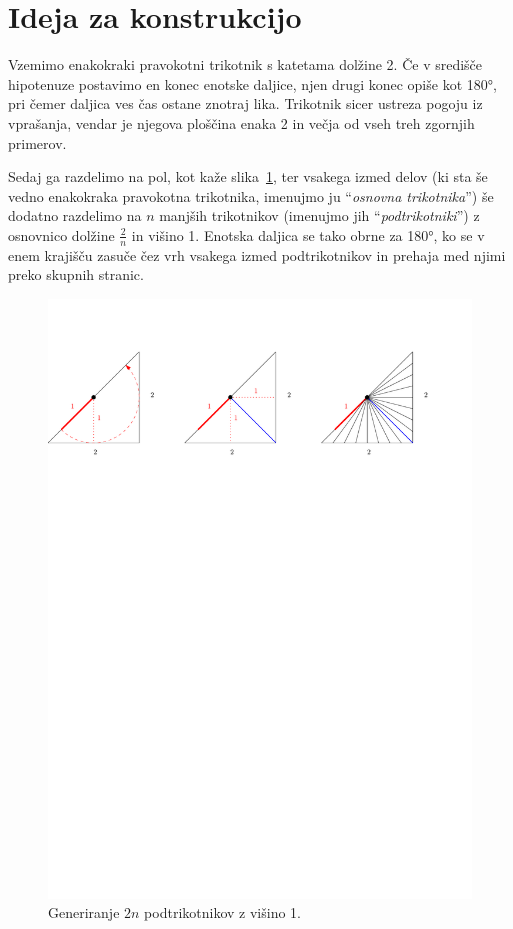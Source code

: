 \documentclass[a4paper, 12pt]{article}
\begin{document}

\section*{Ideja za konstrukcijo}

Vzemimo enakokraki pravokotni trikotnik s katetama dolžine 2. Če v središče hipotenuze postavimo en konec enotske daljice, njen drugi konec opiše kot 180°, pri čemer daljica ves čas ostane znotraj lika. Trikotnik sicer ustreza pogoju iz vprašanja, vendar je njegova ploščina enaka 2 in večja od vseh treh zgornjih primerov.

Sedaj ga razdelimo na pol, kot kaže slika~\ref{trikotnik_razdelitev}, ter vsakega izmed delov (ki sta še vedno enakokraka pravokotna trikotnika, imenujmo ju ``\emph{osnovna trikotnika}'') še dodatno razdelimo na $ n $ manjših trikotnikov (imenujmo jih ``\emph{podtrikotniki}'') z osnovnico dolžine $ \frac{2}{n} $ in višino 1. Enotska daljica se tako obrne za 180°, ko se v enem krajišču zasuče čez vrh vsakega izmed podtrikotnikov in prehaja med njimi preko skupnih stranic.

\begin{figure}[h!]
    \centering
    \includegraphics[width=\textwidth]{ipe_slike/trikotnik_razdelitev.pdf}
    \caption{Generiranje $ 2n $ podtrikotnikov z višino 1.}
    \label{trikotnik_razdelitev}
\end{figure}
\end{document}
